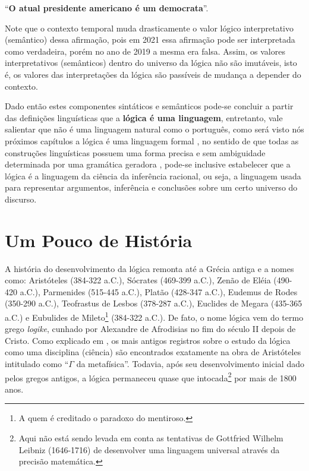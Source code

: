\begin{center}
	``\textbf{O atual presidente americano é um democrata}''.
\end{center}

Note que o contexto temporal muda drasticamente o valor lógico interpretativo (semântico) dessa afirmação, pois em 2021 essa afirmação pode ser interpretada como verdadeira, porém no ano de 2019 a mesma era falsa. Assim, os valores interpretativos (semânticos) dentro do universo da lógica não são imutáveis, isto é, os valores das interpretações da lógica são passíveis de mudança a depender do contexto.

Dado então estes componentes sintáticos e semânticos pode-se concluir a partir das definições linguísticas que a \textbf{lógica é uma linguagem}, entretanto, vale salientar que não é uma linguagem natural como o português, como será visto nós próximos capítulos a lógica é uma linguagem formal \cite{benjaLivro2010}, no sentido de que todas as construções linguísticas possuem uma forma precisa e sem ambiguidade determinada por uma gramática geradora \cite{hopcroft2008, linz2006}, pode-se inclusive estabelecer que a lógica é a linguagem da ciência da inferência racional, ou seja, a linguagem usada para representar argumentos, inferência e conclusões sobre um certo universo do discurso.

\section{Um Pouco de História}\label{sec:LogicsHistory}

A história do desenvolvimento da lógica remonta até a Grécia antiga e a nomes como: Aristóteles (384-322 a.C.), Sócrates (469-399 a.C.), Zenão de Eléia (490-420 a.C.), Parmenides (515-445 a.C.), Platão (428-347 a.C.), Eudemus de Rodes (350-290 a.C.), Teofrastus de Lesbos (378-287 a.C.), Euclides de Megara (435-365 a.C.) e Eubulides de Mileto\footnote{A quem é creditado o paradoxo do mentiroso.} (384-322 a.C.). De fato, o nome lógica vem do termo grego \textit{logike}, cunhado por Alexandre de Afrodisias no fim do século II depois de Cristo. Como explicado em \cite{abe2002-logica}, os mais antigos registros sobre o estudo da lógica como uma disciplina (ciência) são encontrados exatamente na obra de Aristóteles intitulado como ``$\Gamma$ da metafísica''. Todavia, após seu desenvolvimento inicial dado pelos gregos antigos, a lógica permaneceu quase que intocada\footnote{Aqui não está sendo levada em conta as tentativas de Gottfried Wilhelm Leibniz (1646-1716) de desenvolver uma linguagem universal através da precisão matemática.} por mais de 1800 anos.


